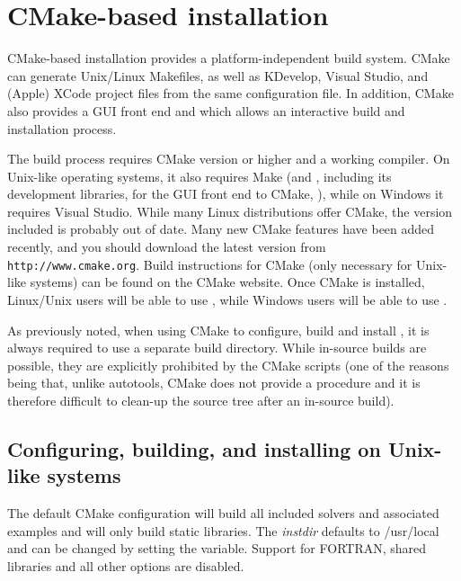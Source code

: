 \section{CMake-based installation}\label{s:cmake_inst}

CMake-based installation provides a platform-independent build system. CMake can generate
Unix/Linux Makefiles, as well as KDevelop, Visual Studio, and 
(Apple) XCode project files from the same configuration file.
In addition, CMake also provides a GUI front end and which allows an interactive build and
installation process.

The {\sundials} build process requires CMake version  or
higher and a working compiler.  On Unix-like operating systems, it
also requires Make (and , including its development libraries,
for the GUI front end to CMake, ), while on Windows it
requires Visual Studio.  While many Linux distributions offer CMake,
the version included is probably out of date.  Many new CMake
features have been added recently, and you should download the latest
version from {\tt http://www.cmake.org}.  Build instructions for CMake
(only necessary for Unix-like systems) can be found on the CMake website.
Once CMake is installed, Linux/Unix users will be able to use ,
while Windows users will be able to use .

As previously noted, when using CMake to configure, build and install {\sundials}, it is always
required to use a separate build directory. While in-source builds are possible, they are
explicitly prohibited by the {\sundials} CMake scripts (one of the reasons being that, unlike
autotools, CMake does not provide a  procedure and it is therefore
difficult to clean-up the source tree after an in-source build).

\subsection{Configuring, building, and installing on Unix-like systems}

The default CMake configuration will build all included solvers and associated examples
and will only build static libraries. The {\em instdir} defaults to /usr/local and can be changed
by setting the  variable.
Support for FORTRAN, shared libraries and all other options are disabled.


